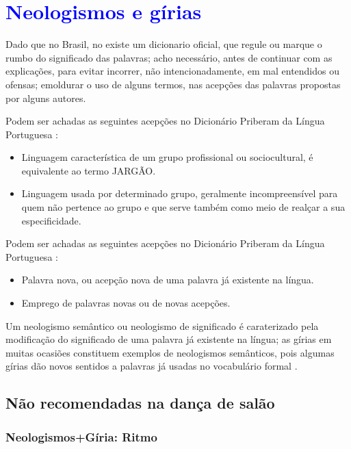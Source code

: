 
\chapter{\textcolor{blue}{Neologismos e gírias}}

Dado que no Brasil, no existe um dicionario oficial, 
que regule ou marque o rumbo do significado das palavras;
acho necessário, antes de continuar com as explicações, 
para evitar incorrer, não intencionadamente, em mal entendidos ou ofensas;
emoldurar o uso de alguns termos, nas acepções das palavras propostas por alguns autores.
\begin{definition}[Gíria:] 
\label{def:Giria}
Podem ser achadas as seguintes acepções no Dicionário Priberam da Língua Portuguesa \cite{priberamgiria}:
\begin{itemize}
\item Linguagem característica de um grupo profissional ou sociocultural, é equivalente ao termo JARGÃO.
\item Linguagem usada por determinado grupo, 
geralmente incompreensível para quem não pertence ao grupo e que serve também como meio de realçar a sua especificidade.
\end{itemize}
\end{definition}

\begin{definition}[Neologismo:] 
\label{def:Neologismo}
Podem ser achadas as seguintes acepções no Dicionário Priberam da Língua Portuguesa \cite{priberamneologismo}:
\begin{itemize}
\item Palavra nova, ou acepção nova de uma palavra já existente na língua.
\item Emprego de palavras novas ou de novas acepções.
\end{itemize}
\end{definition}

\begin{definition} 
\label{def:NeologismoSemantico}
Um neologismo semântico ou neologismo de significado é caraterizado pela modificação do significado de uma palavra já existente na língua;
as gírias em muitas ocasiões constituem exemplos de neologismos semânticos, 
pois algumas gírias dão novos sentidos a palavras já usadas no vocabulário formal \cite[pp. 82-83]{correalingua}.
\end{definition}

\section{Não recomendadas na dança de salão}

\subsection{Neologismos+Gíria: Ritmo}
